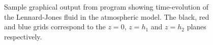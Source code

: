 \documentclass[a4paper,10pt]{article}
\begin{document}
\begin{figure}[htp]
\caption{Sample graphical output from program showing time-evolution of the Lennard-Jones fluid in the atmospheric model. The black, red and blue grids correspond to the $z=0$, $z=h_1$ and $z=h_2$ planes respectively.
}
\label{fig:atmodres}
\end{figure}
\end{document}
